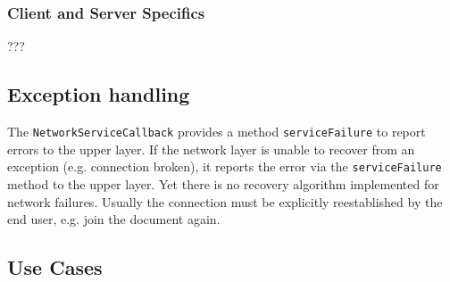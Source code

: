 \subsubsection{Client and Server Specifics}
???

\subsection{Exception handling}
The \texttt{NetworkServiceCallback} provides a method \texttt{serviceFailure} to report errors to the upper layer. If the network layer is unable to recover from an exception (e.g. connection broken), it reports the error via the \texttt{serviceFailure} method to the upper layer. Yet there is no recovery algorithm implemented for network failures. Usually the connection must be explicitly reestablished by the end user, e.g. join the document again.


\subsection{Use Cases}




